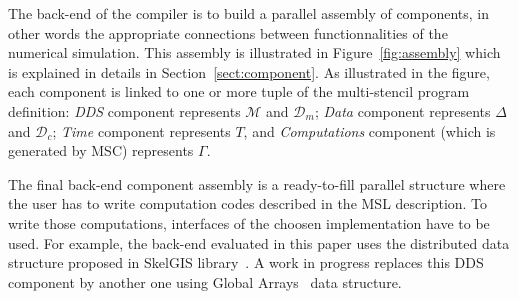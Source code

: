 The back-end of the compiler is to build a parallel assembly of components, in other words the appropriate connections between functionnalities of the numerical simulation. This assembly is illustrated in Figure~\ref{fig:assembly} which is explained in details in Section~\ref{sect:component}. As illustrated in the figure, each component is linked to one or more tuple of the multi-stencil program definition: \emph{DDS} component represents $\mathcal{M}$ and $\mathcal{D}_m$; \emph{Data} component represents $\Delta$ and $\mathcal{D}_c$; \emph{Time} component represents $T$, and \emph{Computations} component (which is generated by MSC) represents $\Gamma$.

The final back-end component assembly is a ready-to-fill parallel structure where the user has to write computation codes described in the MSL description. To write those computations, interfaces of the choosen implementation have to be used. For example, the back-end evaluated in this paper uses the distributed data structure proposed in SkelGIS library~\cite{CPE:CPE3494}. A work in progress replaces this DDS component by another one using Global Arrays~\cite{Nieplocha:2006:AAP:1125980.1125985} data structure.

